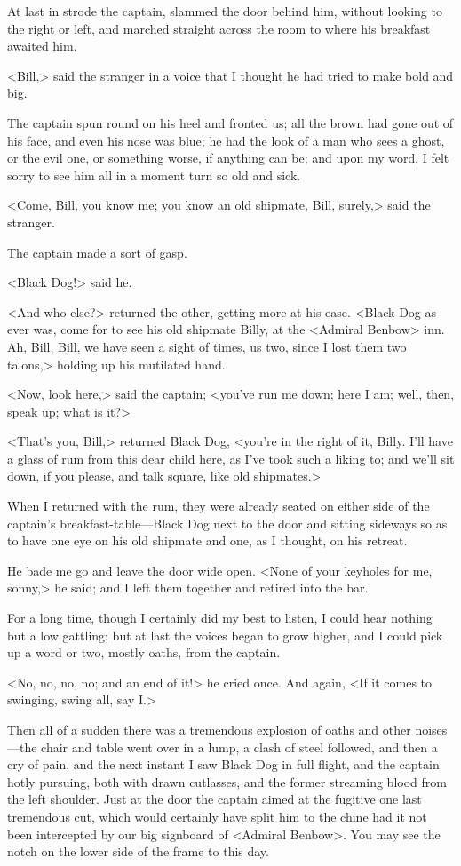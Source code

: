 At last in strode the captain, slammed the door behind him, without looking to the right or left, and marched straight across the room to where his breakfast awaited him.

<Bill,> said the stranger in a voice that I thought he had tried to make bold and big.

The captain spun round on his heel and fronted us; all the brown had gone out of his face, and even his nose was blue; he had the look of a man who sees a ghost, or the evil one, or something worse, if anything can be; and upon my word, I felt sorry to see him all in a moment turn so old and sick.

<Come, Bill, you know me; you know an old shipmate, Bill, surely,> said the stranger.

The captain made a sort of gasp.

<Black Dog!> said he.

<And who else?> returned the other, getting more at his ease. <Black Dog as ever was, come for to see his old shipmate Billy, at the <Admiral Benbow> inn. Ah, Bill, Bill, we have seen a sight of times, us two, since I lost them two talons,> holding up his mutilated hand.

<Now, look here,> said the captain; <you've run me down; here I am; well, then, speak up; what is it?>

<That's you, Bill,> returned Black Dog, <you're in the right of it, Billy. I'll have a glass of rum from this dear child here, as I've took such a liking to; and we'll sit down, if you please, and talk square, like old shipmates.>

When I returned with the rum, they were already seated on either side of the captain's breakfast-table—Black Dog next to the door and sitting sideways so as to have one eye on his old shipmate and one, as I thought, on his retreat.

He bade me go and leave the door wide open. <None of your keyholes for me, sonny,> he said; and I left them together and retired into the bar.

For a long time, though I certainly did my best to listen, I could hear nothing but a low gattling; but at last the voices began to grow higher, and I could pick up a word or two, mostly oaths, from the captain.

<No, no, no, no; and an end of it!> he cried once. And again, <If it comes to swinging, swing all, say I\@.>

 

Then all of a sudden there was a tremendous explosion of oaths and other noises—the chair and table went over in a lump, a clash of steel followed, and then a cry of pain, and the next instant I saw Black Dog in full flight, and the captain hotly pursuing, both with drawn cutlasses, and the former streaming blood from the left shoulder. Just at the door the captain aimed at the fugitive one last tremendous cut, which would certainly have split him to the chine had it not been intercepted by our big signboard of <Admiral Benbow>. You may see the notch on the lower side of the frame to this day.

